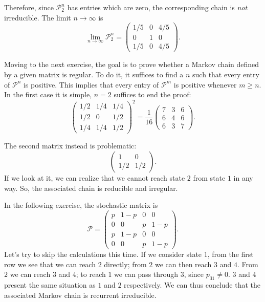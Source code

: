 Therefore, since $\mathcal{P}_{2}^{n}$ has entries which are zero, the
corresponding chain is \emph{not} irreducible. The limit $n \to \infty$ is
\begin{equation}
    \lim_{n \to \infty} \mathcal{P}_{2}^{n} =
    \begin{pmatrix}
        1/5 & 0 & 4/5 \\
        0 & 1 & 0 \\
        1/5 & 0 & 4/5
    \end{pmatrix}.
\end{equation}

Moving to the next exercise, the goal is to prove whether a Markov chain defined
by a given matrix is regular. To do it, it suffices to find a $n$ such that
every entry of $\mathcal{P}^{n}$ is positive. This implies that every entry of
$\mathcal{P}^{m}$ is positive whenever $m \geq n$. In the first case it is
simple, $n = 2$ suffices to end the proof:
\begin{equation}
    \begin{pmatrix}
        1/2 & 1/4 & 1/4 \\
        1/2 &  0  & 1/2 \\
        1/4 & 1/4 & 1/2
    \end{pmatrix}^2
    = \frac{1}{16}
    \begin{pmatrix}
        7 & 3 & 6 \\
        6 & 4 & 6 \\
        6 & 3 & 7
    \end{pmatrix}.
\end{equation}

The second matrix instead is problematic:
\begin{equation}
    \begin{pmatrix}
        1 & 0 \\
        1/2 & 1/2
    \end{pmatrix}.
\end{equation}
If we look at it, we can realize that we cannot reach state $2$ from state $1$
in any way. So, the associated chain is reducible and irregular.

In the following exercise, the stochastic matrix is
\begin{equation}
    \mathcal{P} =
    \begin{pmatrix}
        p  & 1-p &  0  &  0  \\
        0  &  0  &  p  & 1-p \\
        p  & 1-p &  0  &  0  \\
        0  &  0  &  p  & 1-p
    \end{pmatrix}.
\end{equation}
Let’s try to skip the calculations this time. If we consider state $1$, from the
first row we see that we can reach $2$ directly; from $2$ we can then reach $3$
and $4$. From $2$ we can reach $3$ and $4$; to reach $1$ we can pass through
$3$, since $p_{31} \neq 0$. $3$ and $4$ present the same situation as $1$ and
$2$ respectively. We can thus conclude that the associated Markov chain is
recurrent irreducible.

